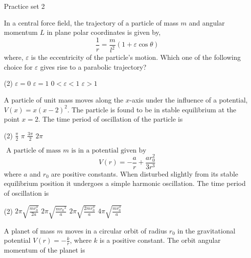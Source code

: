 \newpage
\begin{abox}
	Practice set 2
	\end{abox}
\begin{enumerate}
\begin{minipage}{\textwidth}
	\item In a central force field, the trajectory of a particle of mass $m$ and angular momentum $L$ in plane polar coordinates is given by,\\
	$$\frac{1}{r}=\frac{m}{l^{2}}(1+\varepsilon \cos \theta)$$
	where, $\varepsilon$ is the eccentricity of the particle's motion. Which one of the following choice for $\varepsilon$ gives rise to a parabolic trajectory?
\end{minipage}
\begin{tasks}(2)
	\task[\textbf{A.}] $\varepsilon=0$
	\task[\textbf{B.}]$\varepsilon=1$
	\task[\textbf{C.}] $0<\varepsilon<1$
	\task[\textbf{D.}] $\varepsilon>1$
\end{tasks}
\begin{minipage}{\textwidth}
	\item A particle of unit mass moves along the $x$-axis under the influence of a potential, $V(x)=x(x-2)^{2}$. The particle is found to be in stable equilibrium at the point $x=2$. The time period of oscillation of the particle is
\end{minipage}
\begin{tasks}(2)
	\task[\textbf{A.}] $\frac{\pi}{2}$
	\task[\textbf{B.}]$\pi$
	\task[\textbf{C.}]$\frac{3 \pi}{2}$
	\task[\textbf{D.}] $2 \pi$
\end{tasks}
\begin{minipage}{\textwidth}
	\item $\text { A particle of mass } m \text { is in a potential given by }$
	$$V(r)=-\frac{a}{r}+\frac{a r_{0}^{2}}{3 r^{3}}$$
	where $a$ and $r_{0}$ are positive constants. When disturbed slightly from its stable equilibrium position it undergoes a simple harmonic oscillation. The time period of oscillation is
\end{minipage}
\begin{tasks}(2)
	\task[\textbf{A.}] $2 \pi \sqrt{\frac{m r_{0}^{3}}{2 a}}$
	\task[\textbf{B.}]$2 \pi \sqrt{\frac{m r_{0}{ }^{3}}{a}}$
	\task[\textbf{C.}]$2 \pi \sqrt{\frac{2 m r_{0}^{3}}{a}}$
	\task[\textbf{D.}]$4 \pi \sqrt{\frac{m r_{0}^{3}}{a}}$
\end{tasks}
\begin{minipage}{\textwidth}
	\item A planet of mass $m$ moves in a circular orbit of radius $r_{0}$ in the gravitational potential $V(r)=-\frac{k}{r}$, where $k$ is a positive constant. The orbit angular momentum of the planet is

\end{minipage}
\end{enumerate}
